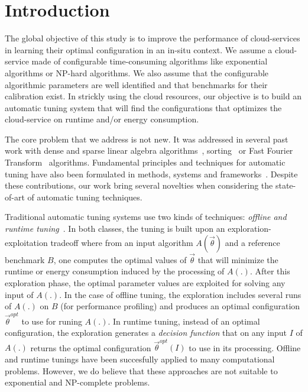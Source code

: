 \documentclass[10pt, conference, compsocconf]{IEEEtran}
\begin{document}
\section{Introduction}

The global objective of this study is to improve the performance of cloud-services in learning their optimal 
configuration in an  in-situ context. We assume a  cloud-service  made of configurable 
time-consuming algorithms like exponential algorithms or  NP-hard algorithms. We also 
assume that the configurable algorithmic parameters are well identified and that benchmarks for their calibration exist. 
In strickly using the cloud resources, our objective is to build an automatic tuning system that will find    
the configurations that optimizes the cloud-service on runtime and/or energy consumption.

The core problem that we address is not new. It was addressed in several past work with  
dense and sparse linear algebra algorithms~\cite{ATLAS,Spiral}, sorting~\cite{Spiral} or Fast Fourier Transform~\cite{FFTW} 
algorithms. Fundamental principles and techniques for automatic tuning have also been formulated in methods, 
systems and frameworks~\cite{Rice,Tapus:2002:AHT:762761.762771,ansel:cases:2012}. Despite these contributions, our work bring 
several novelties when considering the state-of-art of automatic tuning techniques. 

Traditional automatic tuning systems use two kinds of techniques: {\it offline and runtime tuning}~\cite{Tichy:2014:APS:2636925.2636340}. 
In both classes, the tuning is built upon an exploration-exploitation tradeoff where from an input algorithm $A(\vec{\theta})$ 
and a reference benchmark $B$, one computes the optimal values of $\vec{\theta}$ that will minimize the runtime or energy 
consumption induced by the processing of $A(.)$. After this exploration phase, the optimal parameter values are exploited 
for solving any input of $A(.)$. 
In the case of offline tuning, the exploration includes several runs of $A(.)$ on $B$ (for performance profiling) 
and produces an optimal configuration $\vec{\theta}^{opt}$ to use for runing $A(.)$. 
In runtime tuning, instead of an optimal configuration, the exploration generates a {\it decision function} 
that on any input $I$ of $A(.)$ returns the optimal configuration $\vec{\theta}^{opt}(I)$ to use in its processing. 
Offline and runtime tunings have been succesfully applied to many computational problems. However, we do believe that 
these approaches are not suitable to exponential and NP-complete problems. 
\end{document}
